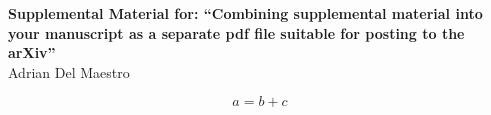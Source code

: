 \documentclass[10pt,twocolumn,prl,aps,floatfix,superscriptaddress,longbibliography]{revtex4-1}
\begin{document}
\clearpage
\pagebreak
\setcounter{page}{1}
\onecolumngrid
\widetext
\begin{center}
    \textbf{{\large Supplemental Material for: ``Combining supplemental material into your manuscript as a separate pdf
    file suitable for posting to the arXiv''}}\\[1em]
    Adrian Del Maestro
\end{center}

\lipsum[1-2]

\begin{equation}
    a = b + c
\end{equation}

\lipsum*[3-6]\cite{Sengupta:2017tl}\\

\lipsum*[7-12]\cite{Barghathi:2018rg}


\end{document}
